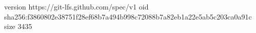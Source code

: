 version https://git-lfs.github.com/spec/v1
oid sha256:f3860802e38751f28ef68b7a494b998c72088b7a82eb1a22e5ab5c203ca0a91c
size 3435
